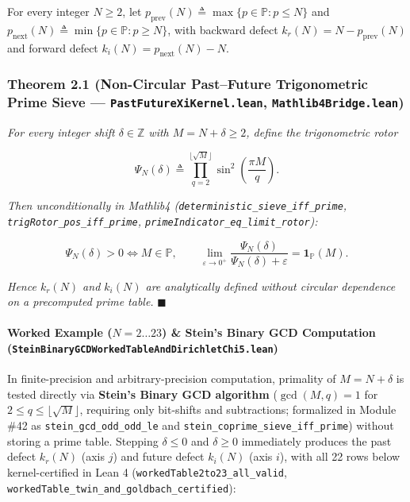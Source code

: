 \documentclass[
  11pt,
]{article}
\begin{document}
For every integer \(N \ge 2\), let
\(p_{\text{prev}}(N) \triangleq \max\{p \in \mathbb{P} : p \le N\}\) and
\(p_{\text{next}}(N) \triangleq \min\{p \in \mathbb{P} : p \ge N\}\),
with backward defect \(k_r(N) = N - p_{\text{prev}}(N)\) and forward
defect \(k_i(N) = p_{\text{next}}(N) - N\).

\subsubsection{\texorpdfstring{Theorem 2.1 (Non-Circular Past--Future
Trigonometric Prime Sieve --- \texttt{PastFutureXiKernel.lean},
\texttt{Mathlib4Bridge.lean})}{Theorem 2.1 (Non-Circular Past--Future Trigonometric Prime Sieve --- PastFutureXiKernel.lean, Mathlib4Bridge.lean)}}\label{theorem-2.1-non-circular-pastfuture-trigonometric-prime-sieve-pastfuturexikernel.lean-mathlib4bridge.lean}

\emph{For every integer shift \(\delta \in \mathbb{Z}\) with
\(M = N + \delta \ge 2\), define the trigonometric rotor}

\[\Psi_N(\delta) \triangleq \prod_{q=2}^{\lfloor\sqrt{M}\rfloor} \sin^2\left(\frac{\pi M}{q}\right).\]

\emph{Then unconditionally in Mathlib4
(\texttt{deterministic\_sieve\_iff\_prime},
\texttt{trigRotor\_pos\_iff\_prime},
\texttt{primeIndicator\_eq\_limit\_rotor}):}

\[\Psi_N(\delta) > 0 \iff M \in \mathbb{P}, \qquad \lim_{\varepsilon \to 0^+} \frac{\Psi_N(\delta)}{\Psi_N(\delta) + \varepsilon} = \mathbf{1}_{\mathbb{P}}(M).\]

\emph{Hence \(k_r(N)\) and \(k_i(N)\) are analytically defined without
circular dependence on a precomputed prime table.} \(\blacksquare\)

\paragraph{\texorpdfstring{Worked Example (\(N = 2 \dots 23\)) \&
Stein's Binary GCD Computation
(\texttt{SteinBinaryGCDWorkedTableAndDirichletChi5.lean})}{Worked Example (N = 2 \textbackslash dots 23) \& Stein's Binary GCD Computation (SteinBinaryGCDWorkedTableAndDirichletChi5.lean)}}\label{worked-example-n-2-dots-23-steins-binary-gcd-computation-steinbinarygcdworkedtableanddirichletchi5.lean}

In finite-precision and arbitrary-precision computation, primality of
\(M = N + \delta\) is tested directly via \textbf{Stein's Binary GCD
algorithm} (\(\gcd(M, q) = 1\) for
\(2 \le q \le \lfloor\sqrt{M}\rfloor\), requiring only bit-shifts and
subtractions; formalized in Module \#42 as
\texttt{stein\_gcd\_odd\_odd\_le} and
\texttt{stein\_coprime\_sieve\_iff\_prime}) without storing a prime
table. Stepping \(\delta \le 0\) and \(\delta \ge 0\) immediately
produces the past defect \(k_r(N)\) (axis \(j\)) and future defect
\(k_i(N)\) (axis \(i\)), with all 22 rows below kernel-certified in Lean
4 (\texttt{workedTable2to23\_all\_valid},
\texttt{workedTable\_twin\_and\_goldbach\_certified}):
\end{document}
